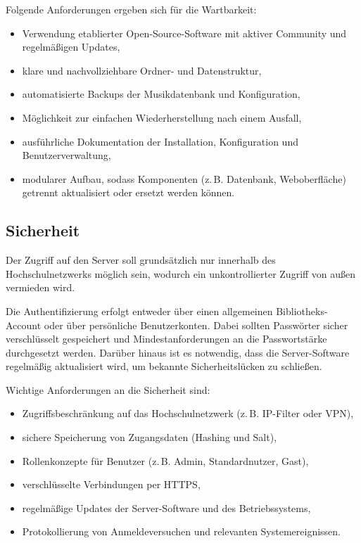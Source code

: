 \documentclass[12pt,a4paper]{report}
\begin{document}
  Folgende Anforderungen ergeben sich für die Wartbarkeit:
  \begin{itemize}
    \item Verwendung etablierter Open-Source-Software mit aktiver Community und regelmäßigen Updates,
    \item klare und nachvollziehbare Ordner- und Datenstruktur,
    \item automatisierte Backups der Musikdatenbank und Konfiguration,
    \item Möglichkeit zur einfachen Wiederherstellung nach einem Ausfall,
    \item ausführliche Dokumentation der Installation, Konfiguration und Benutzerverwaltung,
    \item modularer Aufbau, sodass Komponenten (z.\,B. Datenbank, Weboberfläche) getrennt aktualisiert oder ersetzt werden können.
  \end{itemize}

  \subsection{Sicherheit}  
  Der Zugriff auf den Server soll grundsätzlich nur innerhalb des Hochschulnetzwerks möglich sein, 
  wodurch ein unkontrollierter Zugriff von außen vermieden wird.  

  Die Authentifizierung erfolgt entweder über einen allgemeinen Bibliotheks-Account oder über persönliche Benutzerkonten. 
  Dabei sollten Passwörter sicher verschlüsselt gespeichert und Mindestanforderungen an die Passwortstärke durchgesetzt werden.  
  Darüber hinaus ist es notwendig, dass die Server-Software regelmäßig aktualisiert wird, um bekannte Sicherheitslücken zu schließen.  

  Wichtige Anforderungen an die Sicherheit sind:
  \begin{itemize}
    \item Zugriffsbeschränkung auf das Hochschulnetzwerk (z.\,B. IP-Filter oder VPN),
    \item sichere Speicherung von Zugangsdaten (Hashing und Salt),
    \item Rollenkonzepte für Benutzer (z.\,B. Admin, Standardnutzer, Gast),
    \item verschlüsselte Verbindungen per \ac{HTTPS},
    \item regelmäßige Updates der Server-Software und des Betriebssystems,
    \item Protokollierung von Anmeldeversuchen und relevanten Systemereignissen.
  \end{itemize}
\end{document}
